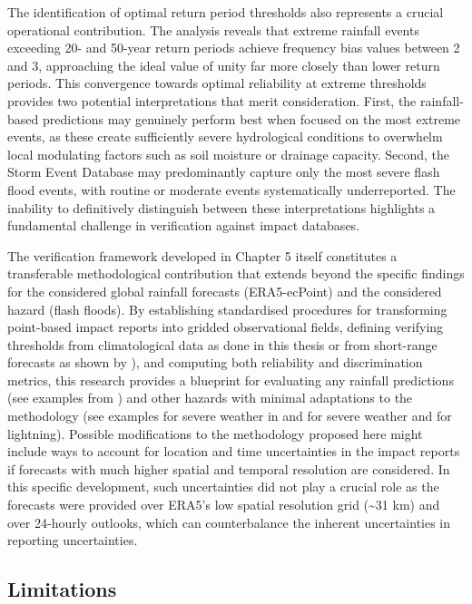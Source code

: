 The identification of optimal return period thresholds also represents a crucial operational contribution. The analysis reveals that extreme rainfall events exceeding 20- and 50-year return periods achieve frequency bias values between 2 and 3, approaching the ideal value of unity far more closely than lower return periods. This convergence towards optimal reliability at extreme thresholds provides two potential interpretations that merit consideration. First, the rainfall-based predictions may genuinely perform best when focused on the most extreme events, as these create sufficiently severe hydrological conditions to overwhelm local modulating factors such as soil moisture or drainage capacity. Second, the Storm Event Database may predominantly capture only the most severe flash flood events, with routine or moderate events systematically underreported. The inability to definitively distinguish between these interpretations highlights a fundamental challenge in verification against impact databases. 

The verification framework developed in Chapter 5 itself constitutes a transferable methodological contribution that extends beyond the specific findings for the considered global rainfall forecasts (ERA5-ecPoint) and the considered hazard (flash floods). By establishing standardised procedures for transforming point-based impact reports into gridded observational fields, defining verifying thresholds from climatological data as done in this thesis or from short-range forecasts as shown by \citet{Pillosu_2024}), and computing both reliability and discrimination metrics, this research provides a blueprint for evaluating any 
rainfall predictions (see examples from \citep{Pillosu_2024}) and other hazards with minimal adaptations to the methodology (see examples for severe weather in \citet{Robbins_2018} and \citet{Tsonevsky_2018} for severe weather and \citet{Cavaiola_2024} for lightning). Possible modifications to the methodology proposed here might include ways to account for location and time uncertainties in the impact reports if forecasts with much higher spatial and temporal resolution are considered. In this specific development, such uncertainties did not play a crucial role as the forecasts were provided over ERA5's low spatial resolution grid (\sim31 km) and over 24-hourly outlooks, which can counterbalance the inherent uncertainties in reporting uncertainties.

\subsection{Limitations}

